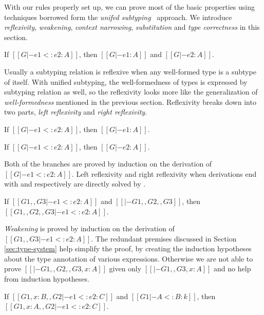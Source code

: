 With our rules properly set up, we can prove most of the basic properties
using techniques borrowed form the \emph{unifed subtyping}~\cite{} approach.
We introduce \emph{reflexivity}, \emph{weakening},
\emph{context narrowing}, \emph{substitution} and \emph{type correctness}
in this section.

\begin{theorem}[Reflexivity]
   If $[[G |- e1 <: e2 : A]]$,
   then $[[G |- e1 : A]]$ and $[[G |- e2 : A]]$.
\end{theorem}

Usually a subtyping relation is reflexive when any well-formed type is a subtype
of itself. With unified subtyping, the well-formedness of types is expressed by
subtyping relation as well, so the reflexivity looks more like the generalization
of \emph{well-formedness} mentioned in the previous section. Reflexivity
breaks down into two parts, \emph{left reflexivity} and \emph{right reflexivity}.

\begin{lemma}
   If $[[G |- e1 <: e2 : A]]$,
   then $[[G |- e1 : A]]$.
\end{lemma}

\begin{lemma}
   If $[[G |- e1 <: e2 : A]]$,
   then $[[G |- e2 : A]]$.
\end{lemma}

\noindent Both of the branches are proved by induction on the derivation of
$[[G |- e1 <: e2 : A]]$.
Left reflexivity and right reflexivity when derivations end with 
and  respectively are directly solved by .

\begin{theorem}[Weakening]
    If $[[G1 ,, G3 |- e1 <: e2 : A]]$ and $[[|- G1 ,, G2 ,, G3]]$,
    then $[[G1 ,, G2 ,, G3 |- e1 <: e2 : A]]$.
\end{theorem}

\noindent \emph{Weakening} is proved by induction on the derivation of
$[[G1 ,, G3 |- e1 <: e2 : A]]$. The redundant premises discussed in Section
\ref{sec:type-system} help simplify the proof, by creating the induction
hypotheses about the type annotation of various expressions. Otherwise we are
not able to prove $[[|- G1 ,, G2 ,, G3 , x : A]]$ given only
$[[|- G1 ,, G3 , x : A]]$ and no help from induction hypotheses.

\begin{theorem}
\label{thm:narrowing}
    If $[[G1 , x : B ,, G2 |- e1 <: e2 : C]]$ and $[[G1 |- A <: B : k]]$,
    then $[[G1 , x : A ,, G2 |- e1 <: e2 : C]]$.
\end{theorem}

